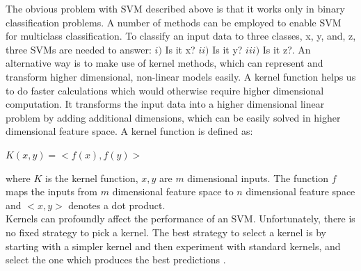     
The obvious problem with SVM described above is that it works only in binary classification problems. A number of methods can be employed to enable SVM for multiclass classification. To classify an input data to three classes, x, y, and, z, three SVMs are needed to answer: $i)$ Is it x? $ii)$ Is it y? $iii)$ Is it z?\cite{noble2006support}.
An alternative way is to make use of kernel methods, which can represent and transform higher dimensional, non-linear models easily. 
A kernel function helps us to do faster calculations which would otherwise require higher dimensional computation. 
It transforms the input data into a higher dimensional linear problem by adding additional dimensions, which can be easily solved in higher dimensional feature space.
A kernel function is defined as:
\begin{center}
  $K (x, y)=<f(x), f(y)>$   
\end{center}
where $K$ is the kernel function, $x, y$ are $m$ dimensional inputs. The function $f$ maps the inputs from $m$ dimensional feature space to $n$ dimensional feature space and
$<x, y>$ denotes a dot product.\\
Kernels can profoundly affect the performance of an SVM. Unfortunately, there is no fixed strategy to pick a kernel. The best strategy to select a kernel is by starting with a simpler kernel and then experiment with standard kernels, and select the one which produces the best predictions \cite{huang2018applications}.

